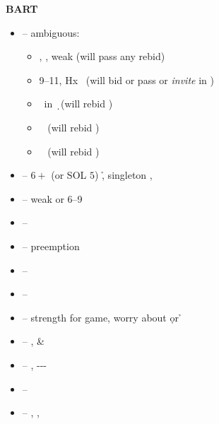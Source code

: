 \textbf{BART}

\begin{itemize}
  \item \ctr{2\d} -- ambiguous:
    \begin{itemize}
      \item {}, , weak (will pass any rebid)
      \item 9--11, Hx \s\ (will bid or pass \ctr{2\s} or \emph{invite} in \nt)
      \item \inv\ in \d\ (will rebid \ctr{3\d})
      \item \so\ \ws{\c} (will rebid \ctr{3\c})
      \item \inv\ \ws{\c} (will rebid )
    \end{itemize}
  \item \ctr{2\h} -- $6+$ (or SOL $5$) \h, singleton \s, \so
  \item \ctr{2\s} -- weak \ws{} or 6--9 \wos{}
  \item \ctr{2\nt} -- \inv\ \wos{\c}
  \item \ctr{3\minor/\h} -- preemption
\end{itemize}

\begin{itemize}
  \item \ctr{2\h} -- \so\ \ws{\h}
  \item \ctr{2\s} -- \so\ \wos{\h}
  \item \ctr{2\nt} -- strength for game, worry about \d or \h
  \item \ctr{3\c} -- \gf,  \& 
  \item \ctr{3\d} -- \gf, ---
  \item \ctr{3\h} -- \gf\ \ws{\h}
  \item \ctr{3\s} -- \gf, , 
\end{itemize}
